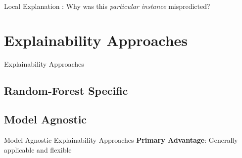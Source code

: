 \documentclass[11pt,dvipsnames,usenames,aspectratio=169]{beamer}  %
\begin{document}
\begin{frame}{Local Explanation}
  : Why was this \textit{particular instance} mispredicted?

  \vspace{16pt}
  \begin{center}
  \end{center}
\end{frame}

\section{Explainability Approaches}

\begin{frame}{Explainability Approaches}

\end{frame}

\subsection{Random-Forest Specific}
\begin{frame}{}

\end{frame}


\subsection{Model Agnostic}

\begin{frame}{Model Agnostic Explainability Approaches}
  \textbf{Primary Advantage}: Generally applicable and flexible
\end{frame}
\end{document}
